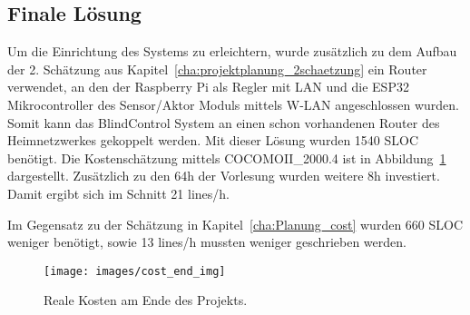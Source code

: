 \subsection{Finale Lösung}
Um die Einrichtung des Systems zu erleichtern, wurde zusätzlich zu dem Aufbau der 2. Schätzung aus Kapitel~\ref{cha:projektplanung_2schaetzung} ein Router verwendet, an den der Raspberry Pi als Regler mit LAN und die ESP32 Mikrocontroller des Sensor/Aktor Moduls mittels W-LAN angeschlossen wurden. Somit kann das BlindControl System an einen schon vorhandenen Router des Heimnetzwerkes gekoppelt werden. Mit dieser Lösung wurden 1540 SLOC benötigt. Die Kostenschätzung mittels COCOMOII\_2000.4 ist in Abbildung~\ref{fig:cost_end} dargestellt. Zusätzlich zu den 64h der Vorlesung wurden weitere 8h investiert. Damit ergibt sich im Schnitt 21 lines/h. 

Im Gegensatz zu der Schätzung in Kapitel~\ref{cha:Planung_cost} wurden 660 SLOC weniger benötigt, sowie 13 lines/h mussten weniger geschrieben werden.

\begin{figure}[hbt]
	\centering
	\texttt{[image: images/cost\_end\_img]}
	\caption[Kosten Realität]{Reale Kosten am Ende des Projekts.}
	\label{fig:cost_end}
\end{figure}